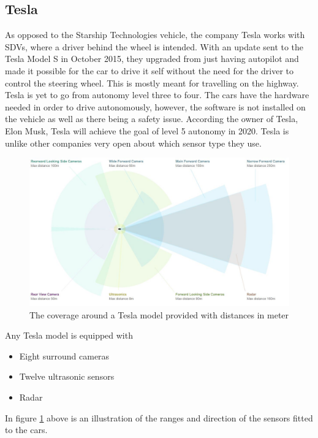\subsection{Tesla}
As opposed to the Starship Technologies vehicle, the company Tesla works with SDVs, where a driver behind the wheel is intended. With an update sent to the Tesla Model S in October 2015, they upgraded from just having autopilot and made it possible for the car to drive it self without the need for the driver to control the steering wheel. This is mostly meant for travelling on the highway\cite{Tesla}.
Tesla is yet to go from autonomy level three to four. The cars have the hardware needed in order to drive autonomously, however, the software is not installed on the vehicle as well as there being a safety issue. According the owner of Tesla, Elon Musk, Tesla will achieve the goal of level 5 autonomy in 2020\cite{Tesla2}. %
Tesla is unlike other companies very open about which sensor type they use. 
\begin{figure}[H]
\centering
\includegraphics[width=\textwidth]{Figures/ConAnalysis/Market/Tesla.JPG}
\caption{The coverage around a Tesla model provided with distances in meter}
\label{fig:Tesla_market}
\end{figure}
Any Tesla model is equipped with
\begin{itemize}
    \item Eight surround cameras
    \item Twelve ultrasonic sensors
    \item Radar
\end{itemize}
\noindent In figure \ref{fig:Tesla_market} above is an illustration of the ranges and direction of the sensors fitted to the cars. \cite{tesla_autoP}
